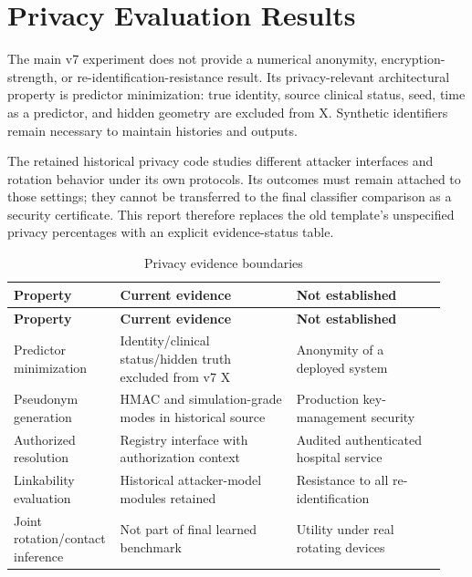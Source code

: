 \documentclass[12pt,a4paper]{report}
\begin{document}
\section{Privacy Evaluation Results}
The main v7 experiment does not provide a numerical anonymity, encryption-strength, or re-identification-resistance result. Its privacy-relevant architectural property is predictor minimization: true identity, source clinical status, seed, time as a predictor, and hidden geometry are excluded from X. Synthetic identifiers remain necessary to maintain histories and outputs.

The retained historical privacy code studies different attacker interfaces and rotation behavior under its own protocols. Its outcomes must remain attached to those settings; they cannot be transferred to the final classifier comparison as a security certificate. This report therefore replaces the old template's unspecified privacy percentages with an explicit evidence-status table.

\begingroup
\small{}\setlength{\tabcolsep}{3pt}
\begin{longtable}{>{\raggedright\arraybackslash}p{0.200\linewidth}>{\raggedright\arraybackslash}p{0.400\linewidth}>{\raggedright\arraybackslash}p{0.340\linewidth}}
\caption{Privacy evidence boundaries}\label{tab:privacy}\\
\toprule
\textbf{Property} & \textbf{Current evidence} & \textbf{Not established}\\
\midrule
\endfirsthead
\toprule
\textbf{Property} & \textbf{Current evidence} & \textbf{Not established}\\
\midrule
\endhead
\bottomrule
\endfoot
Predictor minimization & Identity/\allowbreak{}clinical status/\allowbreak{}hidden truth excluded from v7 X & Anonymity of a deployed system\\
Pseudonym generation & HMAC and simulation-grade modes in historical source & Production key-management security\\
Authorized resolution & Registry interface with authorization context & Audited authenticated hospital service\\
Linkability evaluation & Historical attacker-model modules retained & Resistance to all re-identification\\
Joint rotation/\allowbreak{}contact inference & Not part of final learned benchmark & Utility under real rotating devices\\
\end{longtable}
\endgroup
\end{document}
